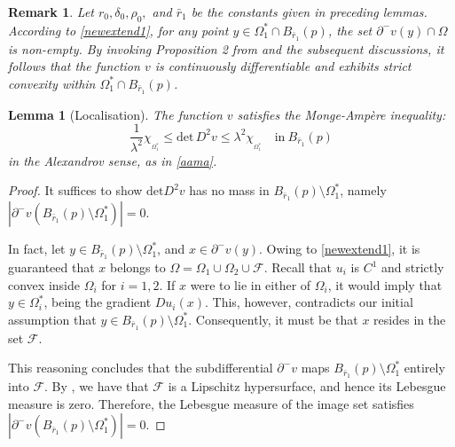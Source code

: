 \documentclass[10pt,a4paper]{amsart}
\theoremstyle{plain}
\newtheorem{lemma}{Lemma}[section]
\newtheorem{remark}{Remark}[section]
\renewcommand{\det}{\mbox{det}}
\newcommand{\0}{\textbf{0}}
\numberwithin{equation}{section}
\numberwithin{equation}{section}
\numberwithin{figure}{section}
\begin{document}
\begin{remark}
\emph{ Let \( r_0, \delta_0, \rho_0, \) and \( \bar r_1 \) be the constants given in preceding lemmas. 
According to \eqref{newextend1}, for any point \( y \in \Omega_1^* \cap B_{\bar r_1}(p) \), the set \( \partial^{-}v(y) \cap \Omega \) is non-empty. By invoking Proposition 2 from \cite{FK1} and the subsequent discussions, it follows that the function \( v \) is continuously differentiable and exhibits strict convexity within \( \Omega_1^* \cap B_{\bar r_1}(p) \). }
\end{remark}


\begin{lemma}[Localisation]
The function $v$ satisfies the Monge-Amp\`ere inequality:
\begin{equation}\label{lockey1}
\frac{1}{\lambda^2}\chi_{_{\Omega^*_1}} \leq \det\, D^2v \leq \lambda^2\chi_{_{\Omega^*_1}} 
\quad \text{in} \ B_{\bar r_1}(p)
\end{equation}
in the Alexandrov sense, as in \eqref{aama}. 
\end{lemma}

\begin{proof}
It suffices to show $\det D^2v$ has no mass in $B_{\bar r_1}(p) \setminus \Omega_1^*$, namely $|\partial^{-}v(B_{\bar r_1}(p) \setminus \Omega_1^*)| =0$. 

In fact, let $ y\in B_{\bar r_1}(p) \setminus \Omega_1^*$, and $x\in \partial^{-}v(y)$. Owing to \eqref{newextend1}, it is guaranteed that \( x \) belongs to \( \Omega = \Omega_1 \cup \Omega_2 \cup \mathcal{F} \).
Recall that $u_i$ is $C^1$ and strictly convex inside $\Omega_i$ for $i=1, 2.$
 If \( x \) were to lie in either of \( \Omega_i \), it would imply that \( y \in\Omega_i^* \), being the gradient \( Du_i(x) \). This, however, contradicts our initial assumption that \( y \in B_{\bar r_1}(p) \setminus \Omega_1^* \). Consequently, it must be that \( x \) resides in the set \( \mathcal{F} \).

This reasoning concludes that the subdifferential \( \partial^{-}v \) maps \( B_{\bar r_1}(p) \setminus \Omega_1^* \) entirely into \( \mathcal{F} \). 
 By \cite[Theorem 5.1]{CL1}, we have that $\mathcal{F}$ is a Lipschitz hypersurface, and hence its Lebesgue measure is zero.
Therefore, the Lebesgue measure of the image set satisfies $|\partial^{-}v(B_{\bar r_1}(p) \setminus \Omega_1^*)| =0$.
\end{proof}
\end{document}
